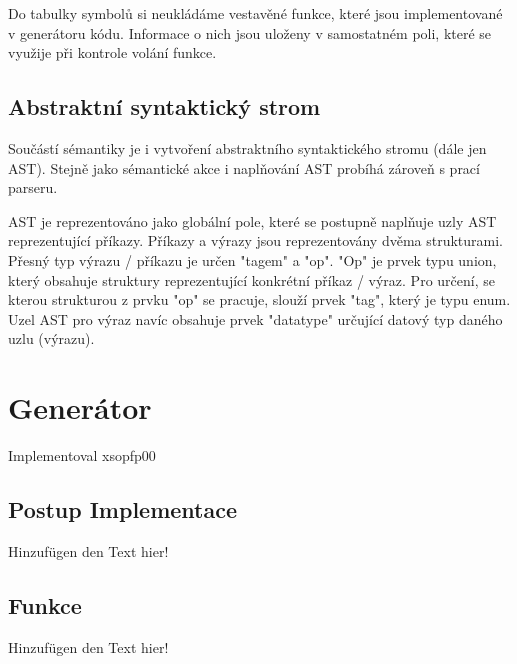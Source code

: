 \documentclass[11pt,a4paper]{article}
\begin{document}
    Do tabulky symbolů si neukládáme vestavěné funkce, které jsou implementované v generátoru kódu. Informace o nich jsou uloženy v samostatném poli, které se využije při kontrole volání funkce.
    
    \subsection{Abstraktní syntaktický strom}
    Součástí sémantiky je i vytvoření abstraktního syntaktického stromu (dále jen AST). Stejně jako sémantické akce i naplňování AST probíhá zároveň s prací parseru.
    
    AST je reprezentováno jako globální pole, které se postupně naplňuje uzly AST reprezentující příkazy. Příkazy a výrazy jsou reprezentovány dvěma strukturami. Přesný typ výrazu / příkazu je určen "tagem" a "op". "Op" je prvek typu union, který obsahuje struktury reprezentující konkrétní příkaz / výraz. Pro určení, se kterou strukturou z prvku "op" se pracuje, slouží prvek "tag", který je typu enum. Uzel AST pro výraz navíc obsahuje prvek "datatype" určující datový typ daného uzlu (výrazu).
	\newpage


\section{Generátor}
    Implementoval xsopfp00

    \subsection{Postup Implementace}
    \noindent Hinzufügen den Text hier!

    \subsection{Funkce}
    \noindent Hinzufügen den Text hier!
    \newpage
\end{document}
